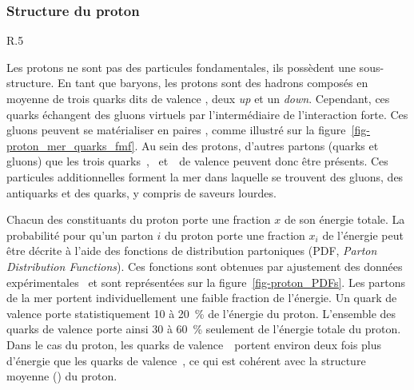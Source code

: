 \subsubsection{Structure du proton}
\begin{wrapfigure}{R}{.5\textwidth}
\centering
\vspace{1.2\baselineskip}

\vspace{1.2\baselineskip}
\caption{Diagramme de Feynman de la propagation d'un proton avec apparition d'une paire \quark\antiquark.}
\label{fig-proton_mer_quarks_fmf}
\end{wrapfigure}
Les protons ne sont pas des particules fondamentales, ils possèdent une sous-structure.
En tant que baryons, les protons sont des hadrons composés en moyenne de trois quarks dits \og de valence \fg{}, deux \emph{up} et un \emph{down}.
Cependant, ces quarks échangent des gluons virtuels par l'intermédiaire de l'interaction forte.
Ces gluons peuvent se matérialiser en paires \quark\antiquark, comme illustré sur la figure~\ref{fig-proton_mer_quarks_fmf}.
Au sein des protons, d'autres partons (quarks et gluons) que les trois quarks~\quarku, \quarku\ et~\quarkd\ de valence peuvent donc être présents.
Ces particules additionnelles forment la \og mer \fg{} dans laquelle se trouvent des gluons, des antiquarks et des quarks, y compris de saveurs lourdes.
\par Chacun des constituants du proton porte une fraction $x$ de son énergie totale.
La probabilité pour qu'un parton $i$ du proton porte une fraction $x_i$ de l'énergie peut être décrite à l'aide des fonctions de distribution partoniques (PDF, \emph{Parton Distribution Functions}).
Ces fonctions sont obtenues par ajustement des données expérimentales~\cite{Gao_2018,Ball_2015} et sont représentées sur la figure~\ref{fig-proton_PDFs}.
Les partons de la mer portent individuellement une faible fraction de l'énergie.
Un quark de valence porte statistiquement \num{10} à \SI{20}{\%} de l'énergie du proton.
L'ensemble des quarks de valence porte ainsi \num{30} à \SI{60}{\%} seulement de l'énergie totale du proton.
Dans le cas du proton, les quarks de valence~\quarku\ portent environ deux fois plus d'énergie que les quarks de valence~\quarkd, ce qui est cohérent avec la structure moyenne (\quarku\quarku\quarkd) du proton.
